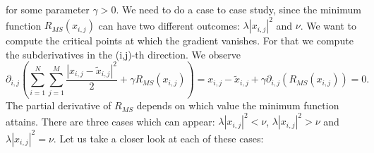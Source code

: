 \documentclass[abstracton]{scrreprt}
\begin{document}
            for some parameter $\gamma > 0$. We need to do a case to case study, since the minimum function $R_{MS}(x_{i,j})$ can have two different outcomes: $\lambda |x_{i,j}|^{2}$ and $\nu$. We want to compute the critical points at which the gradient vanishes. For that we compute the subderivatives in the (i,j)-th direction. We observe
                \begin{equation}
                    \partial_{i,j} \left( \sum_{i = 1}^{N} \sum_{j = 1}^{M} \frac{|x_{i,j} - \tilde{x}_{i,j}|^{2}}{2} + \gamma R_{MS}(x_{i,j}) \right) = x_{i,j} - \tilde{x}_{i,j} + \gamma \partial_{i,j} (R_{MS}(x_{i,j})) = 0.
                    \label{eq:partial_r}
                \end{equation}
            The partial derivative of $R_{MS}$ depends on which value the minimum function attains. There are three cases which can appear: $\lambda |x_{i,j}|^{2} < \nu$, $\lambda |x_{i,j}|^{2} > \nu$ and $\lambda |x_{i,j}|^{2} = \nu$. Let us take a closer look at each of these cases:
\end{document}
